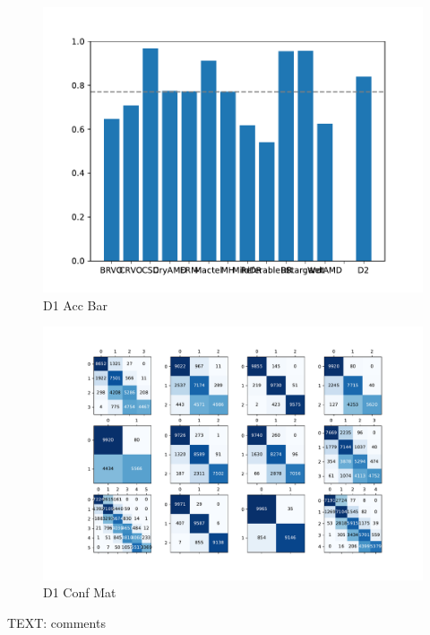 \documentclass{article}
\begin{document}
			\begin{figure}[htbp]
				\centering
				\includegraphics[width=\linewidth]{Figs/diagnosis1_acc_barchart.pdf}
				\caption{D1 Acc Bar}
				\vspace{0.3cm}
				\label{fig:D1_acc_bar}
			\end{figure}
			
			\begin{figure}[htbp]
				\centering
				\includegraphics[width=\linewidth]{Figs/diagnosis1_confusion_matrix.pdf}
				\caption{D1 Conf Mat}
				\vspace{0.3cm}
				\label{fig:D1_conf_mat}
			\end{figure}
			TEXT: comments
			
\end{document}
